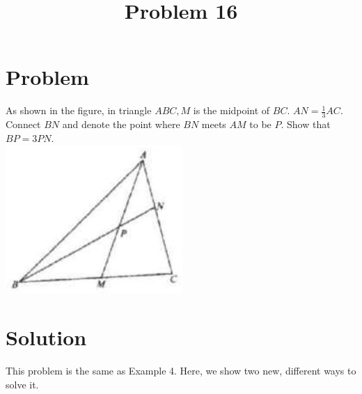 \documentclass{article}
\title{Problem 16}
\date{}
\begin{document}
\maketitle

\section*{Problem}
As shown in the figure, in triangle \(A B C, M\) is the midpoint of \(B C\). \(A N=\frac{1}{3} A C\). Connect \(B N\) and denote the point where \(B N\) meets \(A M\) to be \(P\). Show that \(B P=3 P N\).\\
\centering
\includegraphics[width=\textwidth]{images/129(4).jpg}

\section*{Solution}
This problem is the same as Example 4. Here, we show two new, different ways to solve it.
\end{document}
